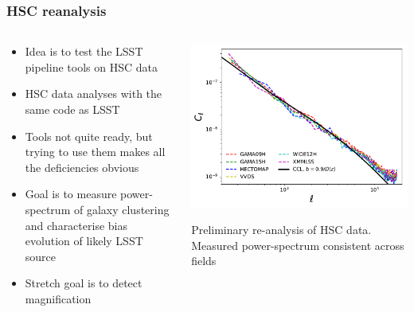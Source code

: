 \documentclass[aspectratio=169]{beamer}
\begin{document}
\begin{frame}
  \frametitle{HSC reanalysis}

  \begin{columns}
    \begin{column}{5cm}
      \begin{itemize}
      \item Idea is to test the LSST pipeline tools on HSC data
      \item HSC data analyses with the same code as LSST
      \item Tools not quite ready, but trying to use them makes all
        the deficiencies obvious
      \item Goal is to measure power-spectrum of galaxy clustering and
        characterise bias evolution of likely LSST source
      \item Stretch goal is to detect magnification
      \end{itemize}
    \end{column}
    \begin{column}{6cm}
      \includegraphics[width=\linewidth]{./cls_hsc.pdf}
      \begin{center}
        \scriptsize Preliminary re-analysis of HSC data. Measured
        power-spectrum consistent across fields 
      \end{center}

    \end{column}
  \end{columns}


\end{frame}
\end{document}
